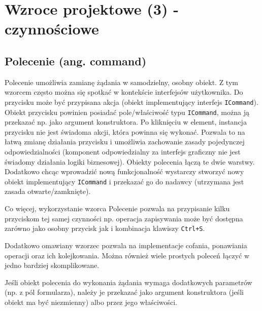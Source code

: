 \section{Wzroce projektowe (3) - czynnościowe }
\subsection{Polecenie (ang. command)}
Polecenie umożliwia zamianę żądania w samodzielny, osobny obiekt. Z tym wzorcem często można się spotkać w kontekście interfejsów użytkownika. Do przycisku może być przypisana akcja (obiekt implementujący interfejs \texttt{ICommand}). Obiekt przycisku powinien posiadać pole/właściwość typu \texttt{ICommand}, można ją przekazać np. jako argument konstruktora. Po kliknięciu w element, instancja przycisku nie jest świadoma akcji, która powinna się wykonać. Pozwala to na łatwą zmianę działania przycisku i umożliwia zachowanie zasady pojedynczej odpowiedzialności (komponent odpowiedzialny za interfejs graficzny nie jest świadomy działania logiki biznesowej). Obiekty polecenia łączą te dwie warstwy. Dodatkowo chcąc wprowadzić nową funkcjonalność wystarczy stworzyć nowy obiekt implementujący \texttt{ICommand} i przekazać go do nadawcy (utrzymana jest zasada otwarte/zamknięte). 

Co więcej, wykorzystanie wzorca Polecenie pozwala na przypisanie kilku przyciskom tej samej czynności np. operacja zapisywania może być dostępna zarówno jako osobny przycisk jak i kombinacja klawiszy \texttt{Ctrl+S}.

Dodatkowo omawiany wzorzec pozwala na implementacje cofania, ponawiania operacji oraz ich kolejkowania. Można również wiele prostych poleceń łączyć w jedno bardziej skomplikowane.

Jeśli obiekt polecenia do wykonania żądania wymaga dodatkowych parametrów (np. z pól formularza), należy je przekazać jako argument konstruktora (jeśli obiekt ma być niezmienny) albo przez jego właściwości.







